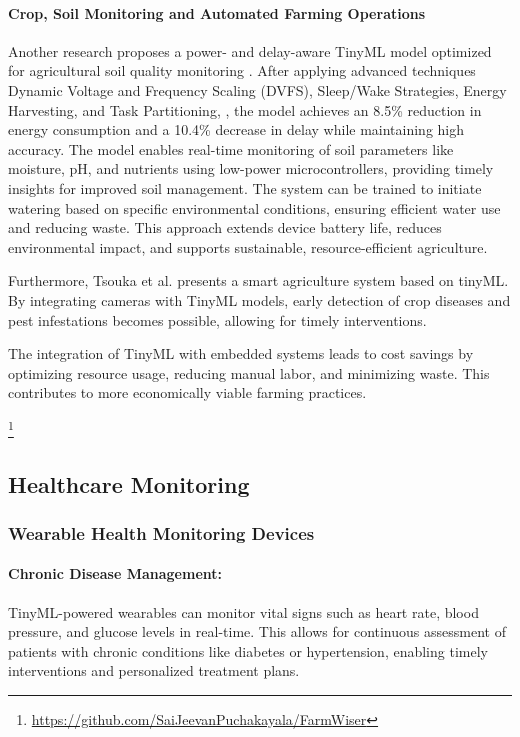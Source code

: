 \documentclass[twocolumn]{article}
\begin{document}
\paragraph{Crop, Soil Monitoring and Automated Farming Operations}

Another research proposes a power- and delay-aware TinyML model optimized for agricultural soil quality monitoring \cite{bhattacharya_deploying_2024}. After applying advanced techniques Dynamic Voltage and Frequency Scaling (DVFS), Sleep/Wake Strategies, Energy Harvesting, and Task Partitioning, , the model achieves an 8.5\% reduction in energy consumption and a 10.4\% decrease in delay while maintaining high accuracy. The model enables real-time monitoring of soil parameters like moisture, pH, and nutrients using low-power microcontrollers, providing timely insights for improved soil management. The system can be trained to initiate watering based on specific environmental conditions, ensuring efficient water use and reducing waste. This approach extends device battery life, reduces environmental impact, and supports sustainable, resource-efficient agriculture. 

Furthermore, Tsouka et al. presents a smart agriculture system based on tinyML. By integrating cameras with TinyML models, early detection of crop diseases and pest infestations becomes possible, allowing for timely interventions. \cite{tsoukas_tinyml-based_2023}

The integration of TinyML with embedded systems leads to cost savings by optimizing resource usage, reducing manual labor, and minimizing waste. This contributes to more economically viable farming practices.

\footnote{\url{https://github.com/SaiJeevanPuchakayala/FarmWiser}}

\subsection{Healthcare Monitoring}

\subsubsection{Wearable Health Monitoring Devices}
\paragraph{Chronic Disease Management:}TinyML-powered wearables can monitor vital signs such as heart rate, blood pressure, and glucose levels in real-time. This allows for continuous assessment of patients with chronic conditions like diabetes or hypertension, enabling timely interventions and personalized treatment plans.
\end{document}
